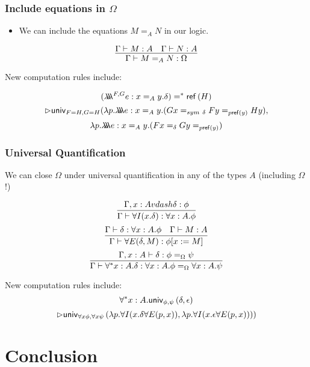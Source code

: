 \begin{frame}
\frametitle{Include equations in $\Omega$}

\begin{itemize}
\item
We can include the equations $M =_A N$ in our logic.
\end{itemize}

\[ \infer{\Gamma \vdash M =_A N : \Omega}{\Gamma \vdash M : A \quad \Gamma \vdash N : A} \]

\pause

New computation rules include:

\[ (\lambda \!\! \lambda \!\! \lambda^{F,G} e:x =_A y . \delta) =^* \mathsf{ref} \left( {H} \right) \]
\[ \rhd \mathsf{univ}_{F = H,G = H}(\lambda p. \lambda \!\! \lambda \!\! \lambda e:x=_Ay. (Gx =_{sym\ \delta} F y =_{p \mathsf{ref} \left( {y} \right)} H y), \]
\[ \lambda p. \lambda \!\! \lambda \!\! \lambda e:x=_A y. (F x =_{\delta} G y =_{p \mathsf{ref} \left( {y} \right)}) \]
\end{frame}

\begin{frame}
\frametitle{Universal Quantification}

We can close $\Omega$ under universal quantification in any of the types $A$ (including $\Omega$!)

\[ \infer{\Gamma \vdash \forall I (x.\delta) : \forall x : A. \phi}{\Gamma, x : A vdash \delta : \phi} \]
\[ \infer{\Gamma \vdash \forall E(\delta, M) : \phi[x:=M]} {\Gamma \vdash \delta : \forall x :A.\phi \quad \Gamma \vdash M : A} \]
\[ \infer{\Gamma \vdash \forall^* x:A.\delta : \forall x:A.\phi =_\Omega \forall x:A.\psi}{\Gamma, x : A \vdash \delta : \phi =_\Omega \psi} \]

\pause

New computation rules include:
\[ \forall^* x:A.\mathsf{univ}_{{\phi} , {\psi}} \left( {\delta} , {\epsilon} \right) \]
\[ \rhd \mathsf{univ}_{{\forall x \phi} , {\forall x \psi}} \left( {\lambda p.\forall I(x. \delta \forall E(p,x))} , {\lambda p. \forall I(x. \epsilon \forall E(p,x)))} \right) \]
\end{frame}

\section{Conclusion}

